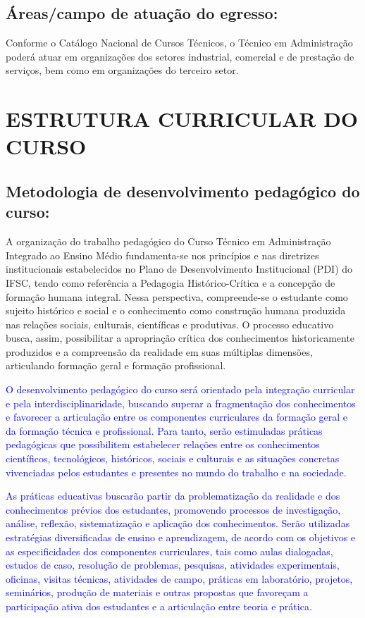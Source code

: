 \documentclass{../../modelos/latex-shared/ifsc-ppc}
\newcommand{\revisao}[1]{\textcolor{blue}{#1}}
\newcommand{\revisao}[1]{#1}
\begin{document}
\subsection{Áreas/campo de atuação do egresso:}
Conforme o Catálogo Nacional de Cursos Técnicos, o Técnico em Administração poderá atuar em organizações dos setores industrial, comercial e de prestação de serviços, bem como em organizações do terceiro setor.

\section{ESTRUTURA CURRICULAR DO CURSO}
\subsection{Metodologia de desenvolvimento pedagógico do curso:}
A organização do trabalho pedagógico do Curso Técnico em Administração Integrado ao Ensino Médio fundamenta-se nos princípios e nas diretrizes institucionais estabelecidos no Plano de Desenvolvimento Institucional (PDI) do IFSC, tendo como referência a Pedagogia Histórico-Crítica e a concepção de formação humana integral. Nessa perspectiva, compreende-se o estudante como sujeito histórico e social e o conhecimento como construção humana produzida nas relações sociais, culturais, científicas e produtivas. O processo educativo busca, assim, possibilitar a apropriação crítica dos conhecimentos historicamente produzidos e a compreensão da realidade em suas múltiplas dimensões, articulando formação geral e formação profissional.

\revisao{O desenvolvimento pedagógico do curso será orientado pela integração curricular e pela interdisciplinaridade, buscando superar a fragmentação dos conhecimentos e favorecer a articulação entre os componentes curriculares da formação geral e da formação técnica e profissional. Para tanto, serão estimuladas práticas pedagógicas que possibilitem estabelecer relações entre os conhecimentos científicos, tecnológicos, históricos, sociais e culturais e as situações concretas vivenciadas pelos estudantes e presentes no mundo do trabalho e na sociedade.}

\revisao{As práticas educativas buscarão partir da problematização da realidade e dos conhecimentos prévios dos estudantes, promovendo processos de investigação, análise, reflexão, sistematização e aplicação dos conhecimentos. Serão utilizadas estratégias diversificadas de ensino e aprendizagem, de acordo com os objetivos e as especificidades dos componentes curriculares, tais como aulas dialogadas, estudos de caso, resolução de problemas, pesquisas, atividades experimentais, oficinas, visitas técnicas, atividades de campo, práticas em laboratório, projetos, seminários, produção de materiais e outras propostas que favoreçam a participação ativa dos estudantes e a articulação entre teoria e prática.}
\end{document}
